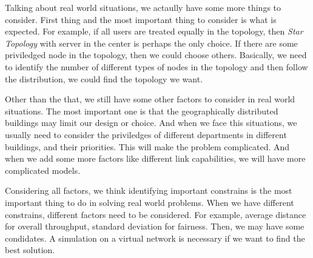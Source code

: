 Talking about real world situations, we actaully have some more things to consider. First thing and
the most important thing to consider is what is expected. For example, if all users are treated 
equally in the topology, then {\it Star Topology} with server in the center is perhaps the only 
choice. If there are some priviledged node in the topology, then we could choose others. Basically, 
we need to identify the number of different types of nodes in the topology and then follow the distribution, 
we could find the topology we want.

Other than the that, we still have some other factors to consider in real world situations. The most 
important one is that the geographically distributed buildings may limit our design or choice. And when 
we face this situations, we usually need to consider the priviledges of different departments in different 
buildings, and their priorities. This will make the problem complicated. And when we add some more factors 
like different link capabilities, we will have more complicated models.

Considering all factors, we think identifying important constrains is the most important thing to do in solving 
real world problems. When we have different constrains, different factors need to be considered. For example, 
average distance for overall throughput, standard deviation for fairness. Then, we may have some condidates. 
A simulation on a virtual network is necessary if we want to find the best solution.
